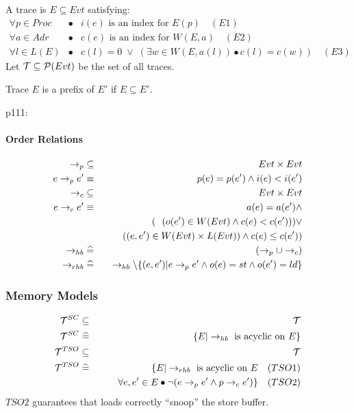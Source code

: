 A trace is $E \subseteq Evt$ satisfying:
\begin{eqnarray*}
   \forall p \in Proc &\bullet& i(e) \mbox{ is an index for } E(p) \quad (E1)
\\ \forall a \in Adr &\bullet& c(e) \mbox{ is an index for } W(E,a) \quad (E2)
\\ \forall l \in L(E)
    &\bullet&
      c(l)=0
      \;\lor\;
      (\exists w \in W(E,a(l))\bullet c(l)=c(w)) \quad (E3)
\end{eqnarray*}
Let $\mathcal{T} \subseteq \mathcal{P}(Evt)$ be the set of all traces.

Trace $E$ is a prefix of $E'$ if $E \subseteq E'$.

p111:

\paragraph{Order Relations}

\begin{eqnarray*}
   \rightarrow_p &\subseteq& Evt \times Evt
\\ e \rightarrow_p e' &\equiv& p(e)=p(e') \land i(e) < i(e')
\\ \rightarrow_c &\subseteq& Evt \times Evt
\\ e \rightarrow_c e'
   &\equiv&
   a(e)=a(e')
   \land
\\ &&\quad (~~(o(e') \in W(Evt) \land c(e)<c(e')))
             \lor
\\ &&\qquad ((e,e')\in W(Evt)\times L(Evt)) \land c(e)\leq c(e') )
\\ \rightarrow_{hb} &\mathrel{\widehat=}& (\rightarrow_p \cup \rightarrow_c)
\\ \rightarrow_{rhb}
   &\mathrel{\widehat=}&
   \rightarrow_{hb}
   \setminus
   \{{(e,e')| e \rightarrow_p e' \land o(e)=st \land o(e')=ld}\}
\end{eqnarray*}

\subsubsection{Memory Models}

\begin{eqnarray*}
   \mathcal{T}^{SC} &\subseteq& \mathcal{T}
\\ \mathcal{T}^{SC} &\mathrel{\widehat=}& \{{ E | \rightarrow_{hb} \mbox{ is acyclic on } E}\}
\\ \mathcal{T}^{TSO} &\subseteq& \mathcal{T}
\\ \mathcal{T}^{TSO}
   &\mathrel{\widehat=}&
   \{ E | \rightarrow_{rhb} \mbox{ is acyclic on } E \quad (TSO1)
\\&& \qquad \forall e,e' \in E \bullet \lnot(e \rightarrow_p e' \land p \rightarrow_c e')
   \} \quad (TSO2)
\end{eqnarray*}
$TSO2$ guarantees that loads correctly ``snoop'' the store buffer.


